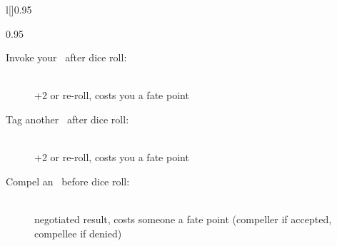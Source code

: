 \begin{wrapfigure}[12]{l}[\sidebarwidth]{0.95\halfbarwidth}%
\begin{shadebox}{0.95\halfbarinnerwidth}%
%
\begin{description}%
\item[Invoke your \Aspect\ after dice roll:]~ \\
+2 or re-roll, costs you a fate point

\item[Tag another \Aspect\ after dice roll:]~ \\
+2 or re-roll, costs you a fate point

\item[Compel an \Aspect\ before dice roll:]~ \\
negotiated result, costs someone a fate point (compeller if accepted, compellee if denied)
\end{description}%
\end{shadebox}%
\end{wrapfigure}%
%